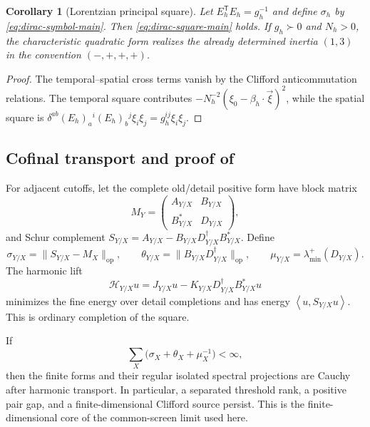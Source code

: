\documentclass[11pt]{article}
\numberwithin{equation}{section}
\newtheorem{corollary}[corollary]{Corollary}
\theoremstyle{definition}
\theoremstyle{remark}
\newcommand{\norm}[1]{\lVert#1\rVert}
\newcommand{\ip}[2]{\left\langle #1,#2\right\rangle}
\newcommand{\op}{\mathrm{op}}
\begin{document}
\begin{corollary}[Lorentzian principal square]
\label{cor:supp-lorentzian-square}
Let $E_h^{\mathsf T}E_h=g_h^{-1}$ and define $\sigma_h$ by
\eqref{eq:dirac-symbol-main}.  Then \eqref{eq:dirac-square-main} holds.
If $g_h\succ0$ and $N_h>0$, the characteristic quadratic form realizes the
already determined inertia $(1,3)$ in the convention $(-,+,+,+)$.
\end{corollary}

\begin{proof}
The temporal--spatial cross terms vanish by the Clifford anticommutation
relations.  The temporal square contributes
$-N_h^{-2}(\xi_0-\beta_h\cdot\vec\xi)^2$, while the spatial square is
$\delta^{ab}(E_h)_a{}^i(E_h)_b{}^j\xi_i\xi_j=g_h^{ij}\xi_i\xi_j$.
\end{proof}

\subsection{Cofinal transport and proof of \texorpdfstring{}{the ADM reconstruction theorem}}

For adjacent cutoffs, let the complete old/detail positive form have block
matrix
\begin{equation}
 M_Y=\begin{pmatrix}A_{Y/X}&B_{Y/X}\\
                     B_{Y/X}^*&D_{Y/X}\end{pmatrix},
 \label{eq:supp-refinement-block}
\end{equation}
and Schur complement
$S_{Y/X}=A_{Y/X}-B_{Y/X}D_{Y/X}^{\dagger}B_{Y/X}^*$.  Define
\begin{equation}
 \sigma_{Y/X}=\norm{S_{Y/X}-M_X}_{\op},
 \qquad
 \theta_{Y/X}=\norm{B_{Y/X}D_{Y/X}^{\dagger}}_{\op},
 \qquad
 \mu_{Y/X}=\lambda_{\min}^+(D_{Y/X}).
 \label{eq:supp-refinement-defects}
\end{equation}
The harmonic lift
\begin{equation}
 \mathcal H_{Y/X}u
 =J_{Y/X}u-K_{Y/X}D_{Y/X}^{\dagger}B_{Y/X}^*u
 \label{eq:supp-harmonic-lift}
\end{equation}
minimizes the fine energy over detail completions and has energy
$\ip{u}{S_{Y/X}u}$.  This is ordinary completion of the square.

If
\begin{equation}
 \sum_X\bigl(\sigma_X+\theta_X+\mu_X^{-1}\bigr)<\infty,
 \label{eq:supp-summable-refinement}
\end{equation}
then the finite forms and their regular isolated spectral projections are
Cauchy after harmonic transport.  In particular, a separated threshold rank,
a positive pair gap, and a finite-dimensional Clifford source persist.  This
is the finite-dimensional core of the common-screen limit used here.
\end{document}
